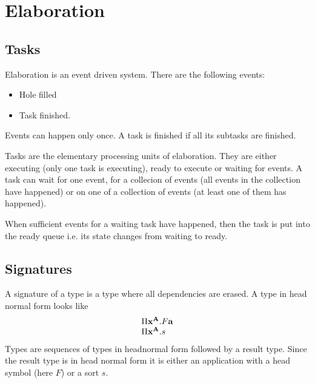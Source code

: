 \section{Elaboration}





\subsection{Tasks}

Elaboration is an event driven system. There are the following events:

\begin{itemize}
    \item Hole filled
    \item Task finished.
\end{itemize}

Events can happen only once. A task is finished if all its subtasks are
finished.

Tasks are the elementary processing units of elaboration. They are either
executing (only one task is executing), ready to execute or waiting for events.
A task can wait for one event, for a collecion of events (all events in the
collection have happened) or on one of a collection of events (at least one of
them has happened).

When sufficient events for a waiting task have happened, then the task is put
into the ready queue i.e. its state changes from waiting to ready.





\subsection{Signatures}

A signature of a type is a type where all dependencies are erased. A type in
head normal form looks like
$$
\begin{array}{l}
    \Pi {{\mathbf x}^{{\mathbf A}}}. F {\mathbf a}
    \\
    \Pi {{\mathbf x}^{{\mathbf A}}}. s
\end{array}
$$
Types are sequences of types in headnormal form followed by a result type. Since
the result type is in head normal form it is either an application with a head
symbol (here $F$) or a sort $s$.

